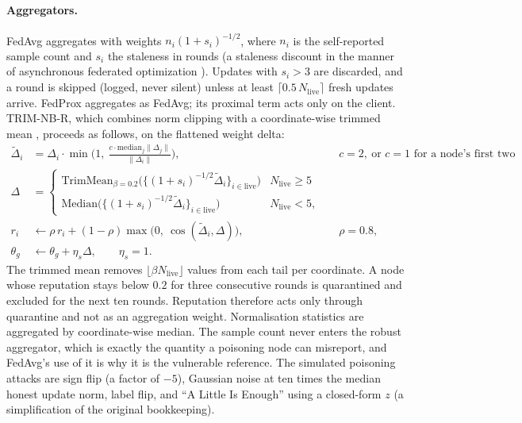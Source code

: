 \documentclass[journal]{IEEEtran}
\begin{document}
\paragraph{Aggregators.}
FedAvg \cite{mcmahan2017fedavg} aggregates with weights $n_i(1+s_i)^{-1/2}$, where $n_i$ is the self-reported
sample count and $s_i$ the staleness in rounds (a staleness discount in the manner of asynchronous federated optimization \cite{xie2019asynchronous}). Updates with $s_i > 3$ are discarded, and a round is skipped
(logged, never silent) unless at least $\lceil 0.5\,N_{\mathrm{live}}\rceil$ fresh updates arrive. FedProx
aggregates as FedAvg; its proximal term acts only on the client. TRIM-NB-R, which combines norm clipping
\cite{sun2019really} with a coordinate-wise trimmed mean \cite{yin2018byzantine}, proceeds as follows, on the
flattened weight delta:
\begin{align}
\tilde\Delta_i &= \Delta_i \cdot \min\!\Big(1,\ \frac{c\cdot \mathrm{median}_j\lVert\Delta_j\rVert}{\lVert\Delta_i\rVert}\Big),
   && c=2,\ \text{or } c=1 \text{ for a node's first two rounds,} \label{eq:clip}\\
\Delta &= \begin{cases}
   \mathrm{TrimMean}_{\beta=0.2}\big(\{(1+s_i)^{-1/2}\tilde\Delta_i\}_{i\in\mathrm{live}}\big) & N_{\mathrm{live}} \ge 5\\
   \mathrm{Median}\big(\{(1+s_i)^{-1/2}\tilde\Delta_i\}_{i\in\mathrm{live}}\big) & N_{\mathrm{live}} < 5,
   \end{cases} \label{eq:trim}\\
r_i &\leftarrow \rho\,r_i + (1-\rho)\max\!\big(0,\ \cos(\tilde\Delta_i,\Delta)\big), && \rho = 0.8, \label{eq:reputation}\\
\theta_g &\leftarrow \theta_g + \eta_s\Delta,\qquad \eta_s=1. \label{eq:serverstep}
\end{align}
The trimmed mean removes $\lfloor\beta N_{\mathrm{live}}\rfloor$ values from each tail per coordinate.
A node whose reputation stays below $0.2$ for three consecutive rounds is quarantined and excluded for the
next ten rounds. Reputation therefore acts only through quarantine and not as an aggregation weight.
Normalisation statistics are aggregated by coordinate-wise median. The sample count never enters the robust
aggregator, which is exactly the quantity a poisoning node can misreport, and FedAvg's use of it is why it is
the vulnerable reference. The simulated poisoning attacks are sign flip (a factor of $-5$),
Gaussian noise at ten times the median honest update norm, label flip, and ``A Little Is Enough''
\cite{baruch2019alie} using a closed-form $z$ (a simplification of the original bookkeeping).
\end{document}
